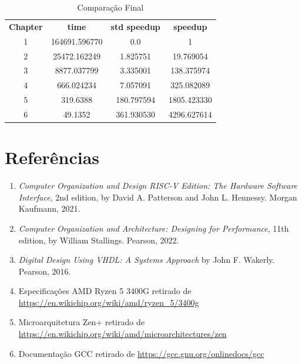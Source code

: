 \documentclass[12pt]{article}
\begin{document}
\begin{table}[h]
    \centering
    \label{tab:final}
    \begin{tabular}{cccc}
        \textbf{Chapter} & \textbf{time} & \textbf{std speedup} & \textbf{speedup} \\
        1 & 164691.596770 & 0.0 & 1 \\
        2 & 25472.162249	 & 1.825751 &	19.769054 \\
        3 & 8877.037799 & 3.335001 &	138.375974 \\
        4 & 666.024234	 & 	7.057091	& 325.082089 \\
        5 & 319.6388	 & 	180.797594 &	1805.423330 \\
        6 & 49.1352	 & 	361.930530	& 4296.627614 \\
    \end{tabular}
    \caption{Comparação Final}
\end{table}

\section{Referências}

\begin{enumerate}
\item \textit{Computer Organization and Design RISC-V Edition: The Hardware Software Interface}, 2nd edition, by David A. Patterson and John L. Hennessy. Morgan Kaufmann, 2021.

\item \textit{Computer Organization and Architecture: Designing for Performance}, 11th edition, by William Stallings. Pearson, 2022.

\item \textit{Digital Design Using VHDL: A Systems Approach} by John F. Wakerly. Pearson, 2016.

\item Especificações AMD Ryzen 5 3400G retirado de \url{https://en.wikichip.org/wiki/amd/ryzen_5/3400g}

\item Microarquitetura Zen+ retirado de \url{https://en.wikichip.org/wiki/amd/microarchitectures/zen}

\item Documentação GCC retirado de \url{https://gcc.gnu.org/onlinedocs/gcc}

\end{enumerate}


\end{document}
